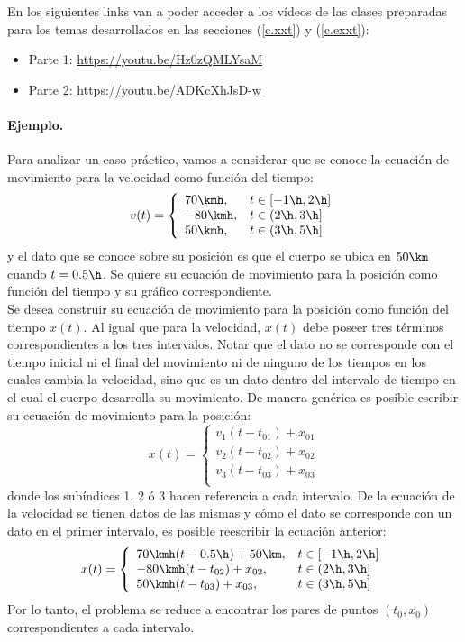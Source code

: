 
En los siguientes links van a poder acceder a los vídeos de las clases
preparadas para los temas desarrollados en las secciones (\ref{c.xxt}) y
(\ref{c.exxt}):

\begin{itemize}
  \item Parte 1: \href{https://youtu.be/Hz0zQMLYsaM}
  {https://youtu.be/Hz0zQMLYsaM}
  \item Parte 2: \href{https://youtu.be/ADKcXhJsD-w}
  {https://youtu.be/ADKcXhJsD-w} \\
\end{itemize}

\paragraph{Ejemplo.} 
Para analizar un caso práctico, vamos a considerar que se conoce la ecuación de
movimiento para la velocidad como función del tiempo:
\[
v(t)= \left\{ 
\begin{array}{ll}
  70\kmh, & t \in [-1\h,2\h] \\
  -80\kmh, & t \in (2\h,3\h] \\
  50\kmh, & t \in (3\h,5\h]\\
\end{array}
\right.
\]
y el dato que se conoce sobre su posición es que el cuerpo se ubica en $50\km$
cuando $t=0.5\h$. Se quiere su ecuación de movimiento para la posición como
función del tiempo y su gráfico correspondiente.\\

Se desea construir su ecuación de movimiento para la posición como función del
tiempo $x(t)$. Al igual que para la velocidad, $x(t)$ debe poseer tres términos
correspondientes a los tres intervalos. Notar que el dato no se corresponde con
el tiempo inicial ni el final del movimiento ni de ninguno de los tiempos en los
cuales cambia la velocidad, sino que es un dato dentro del intervalo de tiempo
en el cual el cuerpo desarrolla su movimiento. De manera genérica es posible
escribir su ecuación de movimiento para la posición:
\[
x(t)= \left\{ 
\begin{array}{ll}
  v_1(t-t_{01}) + x_{01} \\
  v_2(t-t_{02}) + x_{02} \\
  v_3(t-t_{03}) + x_{03} \\
\end{array}
\right.
\]
donde los subíndices 1, 2 ó 3 hacen referencia a cada intervalo. De la ecuación
de la velocidad se tienen datos de las mismas y cómo el dato se corresponde
con un dato en el primer intervalo, es posible reescribir la ecuación anterior:
\[
x(t)= \left\{
\begin{array}{ll}
  70\kmh(t-0.5\h)+50\km, & t \in [-1\h,2\h] \\
  -80\kmh(t-t_{02})+x_{02}, & t \in (2\h,3\h] \\
  50\kmh(t-t_{03})+x_{03}, & t \in (3\h,5\h]\\
\end{array}
\right.
\]
Por lo tanto, el problema se reduce a encontrar los pares de puntos $(t_0,x_0)$
correspondientes a cada intervalo. 

